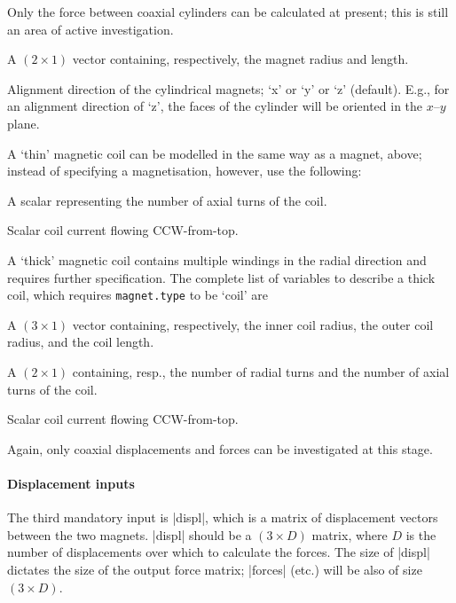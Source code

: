 \documentclass{article}
\begin{document}
Only the force between coaxial cylinders can be calculated at present; this is still an area of active investigation.
\begin{description}[noitemsep,font=\ttfamily]
\item[magnet.dim] A $(2\times1)$ vector containing, respectively, the magnet radius and length.
\item[magnet.dir] Alignment direction of the cylindrical magnets;
`\textsf{x}' or `\textsf{y}' or `\textsf{z}' (default).
E.g., for an alignment direction of `\textsf{z}', the faces of the cylinder will be oriented in the $x$--$y$ plane.
\end{description}
A `thin' magnetic coil can be modelled in the same way as a magnet, above; instead of
specifying a magnetisation, however, use the following:
\begin{description}[noitemsep,font=\ttfamily]
\item[coil.turns] A scalar representing the number of axial turns of the coil.
\item[coil.current] Scalar coil current flowing CCW-from-top.
\end{description}

A `thick' magnetic coil contains multiple windings in the radial direction and requires further specification.
The complete list of variables to describe a thick coil, which requires \texttt{magnet.type} to be `\textsf{coil}' are
\begin{description}[noitemsep,font=\ttfamily]
\item[coil.dim] A $(3\times1)$ vector containing, respectively, the inner coil radius, the outer coil radius, and the coil length.
\item[coil.turns] A $(2\times1)$ containing, resp., the number of radial turns and the number of axial turns of the coil.
\item[coil.current] Scalar coil current flowing CCW-from-top.
\end{description}
Again, only coaxial displacements and forces can be investigated at this stage.

\paragraph{Displacement inputs}

The third mandatory input is |displ|, which is a matrix of displacement vectors between the two magnets. |displ| should be a $(3\times D)$ matrix,
where $D$ is the number of displacements over which to calculate the forces.
The size of |displ| dictates the size of the output force matrix; |forces| (etc.) will be also of size $(3\times D)$.
\end{document}
